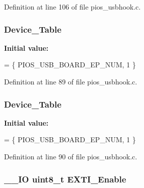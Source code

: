 Definition at line 106 of file pios\-\_\-usbhook.\-c.

\hypertarget{group___p_i_o_s___u_s_b_h_o_o_k_gafa47e7c7d5d6fb4c682e16c89c1b7d75}{
\subsubsection[{Device\-\_\-\-Table}]{ Device\-\_\-\-Table}}\label{group___p_i_o_s___u_s_b_h_o_o_k_gafa47e7c7d5d6fb4c682e16c89c1b7d75}
{\bfseries Initial value\-:}
\begin{DoxyCode}
= \{
        PIOS\_USB\_BOARD\_EP\_NUM,
        1
\}
\end{DoxyCode}


Definition at line 89 of file pios\-\_\-usbhook.\-c.

\hypertarget{group___p_i_o_s___u_s_b_h_o_o_k_gafa47e7c7d5d6fb4c682e16c89c1b7d75}{
\subsubsection[{Device\-\_\-\-Table}]{ Device\-\_\-\-Table}}\label{group___p_i_o_s___u_s_b_h_o_o_k_gafa47e7c7d5d6fb4c682e16c89c1b7d75}
{\bfseries Initial value\-:}
\begin{DoxyCode}
= \{
        PIOS\_USB\_BOARD\_EP\_NUM,
        1
\}
\end{DoxyCode}


Definition at line 90 of file pios\-\_\-usbhook.\-c.

\hypertarget{group___p_i_o_s___u_s_b_h_o_o_k_ga80e4a20c4f7576283232cda440c47694}{
\subsubsection[{E\-X\-T\-I\-\_\-\-Enable}]{\setlength{\rightskip}{0pt plus 5cm}\-\_\-\-\_\-\-I\-O {\bf uint8\-\_\-t} E\-X\-T\-I\-\_\-\-Enable}}\label{group___p_i_o_s___u_s_b_h_o_o_k_ga80e4a20c4f7576283232cda440c47694}


